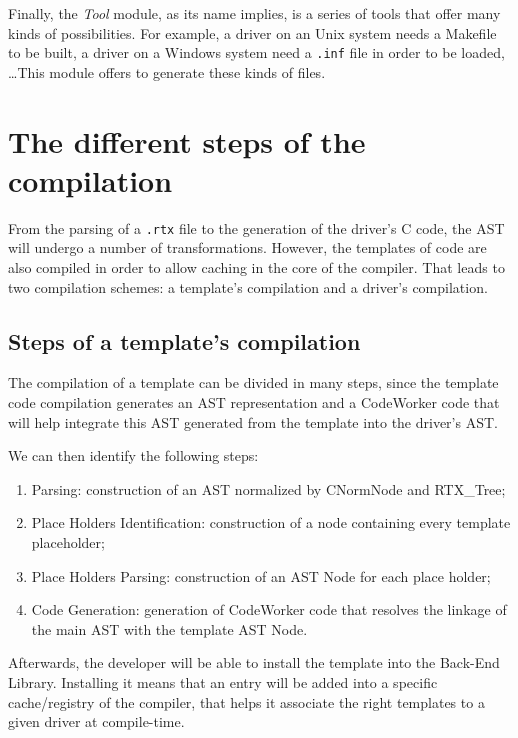 \documentclass[american]{rtxreport}
\begin{document}
Finally, the \emph{Tool} module, as its name implies, is a series of tools that
offer many kinds of possibilities. For example, a driver on an Unix system
needs a Makefile to be built, a driver on a Windows system need a \texttt{.inf}
file in order to be loaded, \ldots This module offers to generate these kinds
of files.


\section{The different steps of the compilation}
\label{sec:compilationSteps}

From the parsing of a \texttt{.rtx} file to the generation of the driver's C
code, the AST will undergo a number of transformations. However, the templates
of code are also compiled in order to allow caching in the core of the compiler.
That leads to two compilation schemes: a template's compilation and a driver's
compilation.

\subsection{Steps of a template's compilation}

The compilation of a template can be divided in many steps, since the template
code compilation generates an AST representation and a CodeWorker code that
will help integrate this AST generated from the template into the driver's AST.

We can then identify the following steps:
\begin{enumerate}
    \item Parsing: construction of an AST normalized by CNormNode and
        RTX\_Tree;
    \item Place Holders Identification: construction of a node containing
        every template placeholder;
    \item Place Holders Parsing: construction of an AST Node for each
        place holder;
    \item Code Generation: generation of CodeWorker code that resolves the
        linkage of the main AST with the template AST Node.
\end{enumerate}

Afterwards, the developer will be able to install the template into the Back-End
Library. Installing it means that an entry will be added into a specific
cache/registry of the compiler, that helps it associate the right templates to
a given driver at compile-time.
\end{document}
